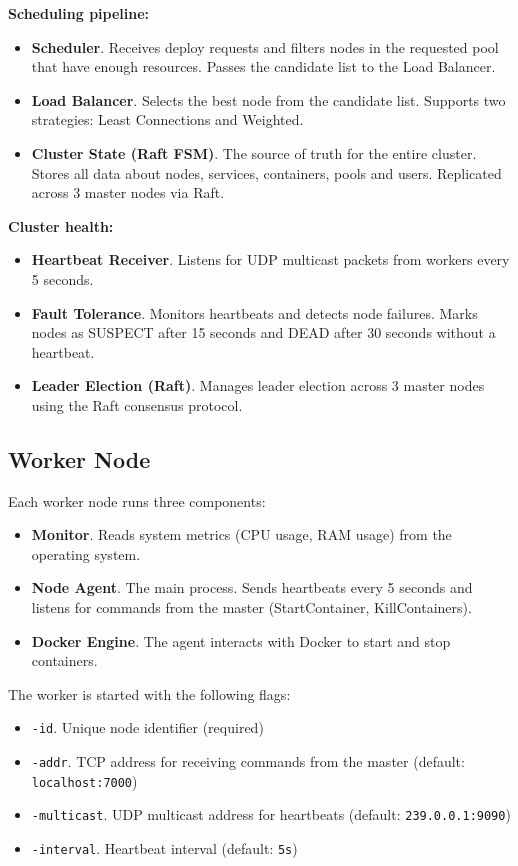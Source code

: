 \textbf{Scheduling pipeline:}
\begin{itemize}
    \item \textbf{Scheduler}. Receives deploy requests and filters nodes in the requested pool that have enough resources. Passes the candidate list to the Load Balancer.
    \item \textbf{Load Balancer}. Selects the best node from the candidate list. Supports two strategies: Least Connections and Weighted.
    \item \textbf{Cluster State (Raft FSM)}. The source of truth for the entire cluster. Stores all data about nodes, services, containers, pools and users. Replicated across 3 master nodes via Raft.
\end{itemize}

\textbf{Cluster health:}
\begin{itemize}
    \item \textbf{Heartbeat Receiver}. Listens for UDP multicast packets from workers every 5 seconds.
    \item \textbf{Fault Tolerance}. Monitors heartbeats and detects node failures. Marks nodes as SUSPECT after 15 seconds and DEAD after 30 seconds without a heartbeat.
    \item \textbf{Leader Election (Raft)}. Manages leader election across 3 master nodes using the Raft consensus protocol.
\end{itemize}

\subsection{Worker Node}

Each worker node runs three components:

\begin{itemize}
    \item \textbf{Monitor}. Reads system metrics (CPU usage, RAM usage) from the operating system.
    \item \textbf{Node Agent}. The main process. Sends heartbeats every 5 seconds and listens for commands from the master (StartContainer, KillContainers).
    \item \textbf{Docker Engine}. The agent interacts with Docker to start and stop containers.
\end{itemize}

The worker is started with the following flags:

\begin{itemize}
    \item \texttt{-id}. Unique node identifier (required)
    \item \texttt{-addr}. TCP address for receiving commands from the master (default: \texttt{localhost:7000})
    \item \texttt{-multicast}. UDP multicast address for heartbeats (default: \texttt{239.0.0.1:9090})
    \item \texttt{-interval}. Heartbeat interval (default: \texttt{5s})
\end{itemize}

